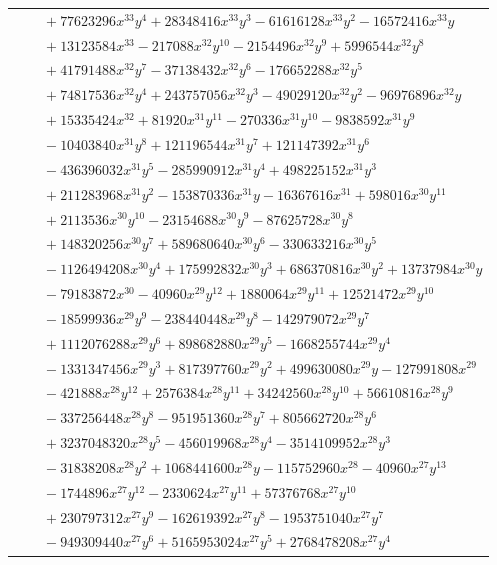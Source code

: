 \documentclass[11pt]{article}
\begin{document}
\begin{longtable}{@{}ll@{}}
 & $\quad +77623296x^{33}y^{4}+28348416x^{33}y^{3}-61616128x^{33}y^{2}-16572416x^{33}y$\\
 & $\quad +13123584x^{33}-217088x^{32}y^{10}-2154496x^{32}y^{9}+5996544x^{32}y^{8}$\\
 & $\quad +41791488x^{32}y^{7}-37138432x^{32}y^{6}-176652288x^{32}y^{5}$\\
 & $\quad +74817536x^{32}y^{4}+243757056x^{32}y^{3}-49029120x^{32}y^{2}-96976896x^{32}y$\\
 & $\quad +15335424x^{32}+81920x^{31}y^{11}-270336x^{31}y^{10}-9838592x^{31}y^{9}$\\
 & $\quad -10403840x^{31}y^{8}+121196544x^{31}y^{7}+121147392x^{31}y^{6}$\\
 & $\quad -436396032x^{31}y^{5}-285990912x^{31}y^{4}+498225152x^{31}y^{3}$\\
 & $\quad +211283968x^{31}y^{2}-153870336x^{31}y-16367616x^{31}+598016x^{30}y^{11}$\\
 & $\quad +2113536x^{30}y^{10}-23154688x^{30}y^{9}-87625728x^{30}y^{8}$\\
 & $\quad +148320256x^{30}y^{7}+589680640x^{30}y^{6}-330633216x^{30}y^{5}$\\
 & $\quad -1126494208x^{30}y^{4}+175992832x^{30}y^{3}+686370816x^{30}y^{2}+13737984x^{30}y$\\
 & $\quad -79183872x^{30}-40960x^{29}y^{12}+1880064x^{29}y^{11}+12521472x^{29}y^{10}$\\
 & $\quad -18599936x^{29}y^{9}-238440448x^{29}y^{8}-142979072x^{29}y^{7}$\\
 & $\quad +1112076288x^{29}y^{6}+898682880x^{29}y^{5}-1668255744x^{29}y^{4}$\\
 & $\quad -1331347456x^{29}y^{3}+817397760x^{29}y^{2}+499630080x^{29}y-127991808x^{29}$\\
 & $\quad -421888x^{28}y^{12}+2576384x^{28}y^{11}+34242560x^{28}y^{10}+56610816x^{28}y^{9}$\\
 & $\quad -337256448x^{28}y^{8}-951951360x^{28}y^{7}+805662720x^{28}y^{6}$\\
 & $\quad +3237048320x^{28}y^{5}-456019968x^{28}y^{4}-3514109952x^{28}y^{3}$\\
 & $\quad -31838208x^{28}y^{2}+1068441600x^{28}y-115752960x^{28}-40960x^{27}y^{13}$\\
 & $\quad -1744896x^{27}y^{12}-2330624x^{27}y^{11}+57376768x^{27}y^{10}$\\
 & $\quad +230797312x^{27}y^{9}-162619392x^{27}y^{8}-1953751040x^{27}y^{7}$\\
 & $\quad -949309440x^{27}y^{6}+5165953024x^{27}y^{5}+2768478208x^{27}y^{4}$\\

\end{longtable}
\end{document}
